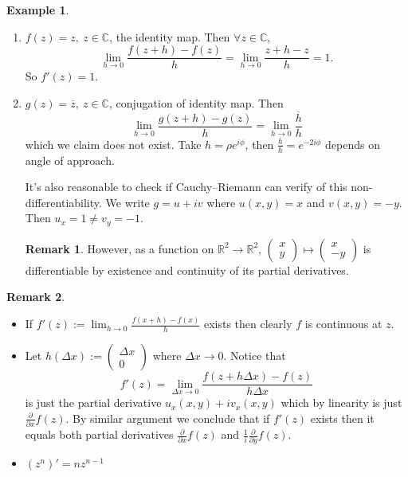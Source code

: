 \documentclass[a4paper]{article}
\theoremstyle{definition}
\newtheorem{example}[defn]{Example}
\newtheorem*{remark}{Remark}
\begin{document}
\begin{example}
\begin{enumerate}
    \item $f(z)=z,\ z\in \mathbb C$, the identity map. Then $\forall z\in \mathbb C$,
    \[
    \lim_{h\rightarrow 0} \frac{f(z+h)-f(z)}{h} = \lim_{h\rightarrow 0} \frac{z+h-z}{h} = 1.
    \]
    So $f'(z)=1$.
    \item $g(z) = \overline{z},\ z\in \mathbb C$, conjugation of identity map. Then
    \[
    \lim_{h\rightarrow 0}\frac{g(z+h)-g(z)}{h} = \lim_{h\rightarrow 0} \frac{\overline{h}}{h}
    \]
    which we claim does not exist. Take $h=\rho e^{i\phi}$, then $\frac{\overline{h}}{h} = e^{-2i\phi}$ depends on angle of approach.
    
    It's also reasonable to check if Cauchy–Riemann can verify of this non-differentiability. We write $g=u+iv$ where $u(x,y)=x$ and $v(x,y)=-y$. Then $u_x=1\neq v_y=-1$.
\begin{remark}
However, as a function on $\mathbb R^2 \rightarrow \mathbb R^2$, $\begin{pmatrix}x\\y\end{pmatrix}\mapsto \begin{pmatrix}x\\-y\end{pmatrix}$ is differentiable by existence and continuity of its partial derivatives.
\end{remark}
\end{enumerate}
\end{example}
\begin{remark}
\begin{itemize}[Demystification]
    \item If $\displaystyle f'(z):=\lim_{h\rightarrow 0} \frac{f(x+h)-f(x)}{h}$ exists then clearly $f$ is continuous at $z$.
    \item Let $h(\Delta x):=\begin{pmatrix} \Delta x \\ 0 \end{pmatrix}$ where $\Delta x \rightarrow 0$. Notice that
    \[
    f'(z)=\lim_{\Delta x \rightarrow 0} \frac{f(z+h\Delta x)-f(z)}{h\Delta x}
    \]
    is just the partial derivative $u_x(x,y)+i v_x(x,y)$ which by linearity is just $\displaystyle \frac{\partial}{\partial x} f(z)$. By similar argument we conclude that if $f'(z)$ exists then it equals both partial derivatives $\displaystyle \frac{\partial}{\partial x} f(z)$ and $\displaystyle \frac{1}{i} \frac{\partial}{\partial y} f(z)$.
    \item $(z^n)'=nz^{n-1}$
\end{itemize}
\end{remark}
\end{document}
